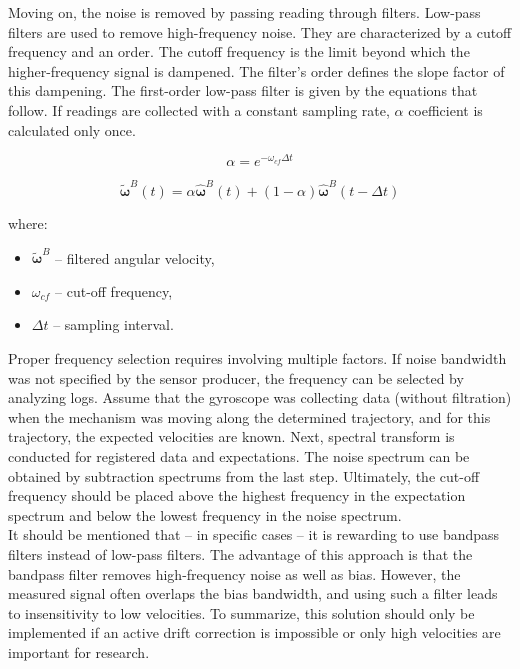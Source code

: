 Moving on, the noise is removed by passing reading through filters. Low-pass filters are used to remove high-frequency noise. They are characterized by a cutoff frequency and an order. The cutoff frequency is the limit beyond which the higher-frequency signal is dampened. The filter’s order defines the slope factor of this dampening. The first-order low-pass filter is given by the equations that follow. If readings are collected with a constant sampling rate, $\alpha$ coefficient is calculated only once.

\begin{equation}
	 \alpha = e^{ - \omega_{cf} \Delta t}
	\label{lpf_alpha}
\end{equation}

\begin{equation}
	\bm{\tilde{\omega}}^B(t) = \alpha  \bm{\hat{\omega}}^B(t) + \left( 1 - \alpha \right) \bm{\hat{\omega}}^B(t - \Delta t)
	\label{lpf}
\end{equation}

where:
\begin{itemize}
	\item $\bm{\tilde{\omega}}^B$ -- filtered angular velocity,
	\item $\omega_{cf}$ -- cut-off frequency,
	\item $\Delta t$ -- sampling interval.
\end{itemize}

Proper frequency selection requires involving multiple factors. If noise bandwidth was not specified by the sensor producer, the frequency can be selected by analyzing logs. Assume that the gyroscope was collecting data (without filtration) when the mechanism was moving along the determined trajectory, and for this trajectory, the expected velocities are known. Next, spectral transform is conducted for registered data and expectations. The noise spectrum can be obtained by subtraction spectrums from the last step. Ultimately, the cut-off frequency should be placed above the highest frequency in the expectation spectrum and below the lowest frequency in the noise spectrum.\\

It should be mentioned that -- in specific cases -- it is rewarding to use bandpass filters instead of low-pass filters. The advantage of this approach is that the bandpass filter removes high-frequency noise as well as bias. However, the measured signal often overlaps the bias bandwidth, and using such a filter leads to insensitivity to low velocities. To summarize, this solution should only be implemented if an active drift correction is impossible or only high velocities are important for research.


